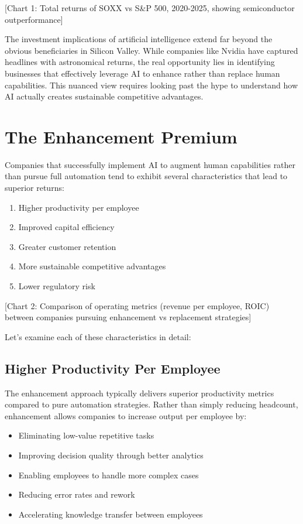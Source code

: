 \documentclass[
  Letterpaper,
]{scrbook}
\providecommand{\tightlist}{%
  \setlength{\itemsep}{0pt}\setlength{\parskip}{0pt}}\usepackage{longtable,booktabs,array}
\begin{document}
{[}Chart 1: Total returns of SOXX vs S\&P 500, 2020-2025, showing
semiconductor outperformance{]}

The investment implications of artificial intelligence extend far beyond
the obvious beneficiaries in Silicon Valley. While companies like Nvidia
have captured headlines with astronomical returns, the real opportunity
lies in identifying businesses that effectively leverage AI to enhance
rather than replace human capabilities. This nuanced view requires
looking past the hype to understand how AI actually creates sustainable
competitive advantages.

\section{The Enhancement Premium}\label{the-enhancement-premium}

Companies that successfully implement AI to augment human capabilities
rather than pursue full automation tend to exhibit several
characteristics that lead to superior returns:

\begin{enumerate}
\def\labelenumi{\arabic{enumi}.}
\tightlist
\item
  Higher productivity per employee
\item
  Improved capital efficiency
\item
  Greater customer retention
\item
  More sustainable competitive advantages
\item
  Lower regulatory risk
\end{enumerate}

{[}Chart 2: Comparison of operating metrics (revenue per employee, ROIC)
between companies pursuing enhancement vs replacement strategies{]}

Let's examine each of these characteristics in detail:

\subsection{Higher Productivity Per
Employee}\label{higher-productivity-per-employee}

The enhancement approach typically delivers superior productivity
metrics compared to pure automation strategies. Rather than simply
reducing headcount, enhancement allows companies to increase output per
employee by:

\begin{itemize}
\tightlist
\item
  Eliminating low-value repetitive tasks
\item
  Improving decision quality through better analytics
\item
  Enabling employees to handle more complex cases
\item
  Reducing error rates and rework
\item
  Accelerating knowledge transfer between employees
\end{itemize}
\end{document}
